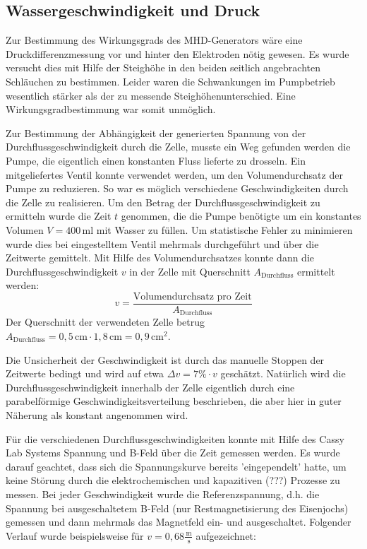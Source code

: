 \documentclass[11pt]{scrartcl}
\newcommand{\unit}[1]{\ensuremath{\,\mathrm{#1}}} %
\begin{document}
\subsection{Wassergeschwindigkeit und Druck}		%
Zur Bestimmung des Wirkungsgrads des MHD-Generators wäre eine Druckdifferenzmessung vor und hinter den Elektroden nötig gewesen.
Es wurde versucht dies mit Hilfe der Steighöhe in den beiden seitlich angebrachten Schläuchen zu bestimmen. Leider waren die Schwankungen im Pumpbetrieb wesentlich stärker als der zu messende Steighöhenunterschied.
Eine Wirkungsgradbestimmung war somit unmöglich.

Zur Bestimmung der Abhängigkeit der generierten Spannung von der Durchflussgeschwindigkeit durch die Zelle, musste ein Weg gefunden werden die Pumpe, die eigentlich einen konstanten Fluss lieferte zu drosseln.
Ein mitgeliefertes Ventil konnte verwendet werden, um den Volumendurchsatz der Pumpe zu reduzieren. So war es möglich verschiedene Geschwindigkeiten durch die Zelle zu realisieren.
Um den Betrag der Durchflussgeschwindigkeit zu ermitteln wurde die Zeit $t$ genommen, die die Pumpe benötigte um ein konstantes Volumen $V=400\unit{ml}$ mit Wasser zu füllen. Um statistische Fehler zu minimieren wurde dies bei eingestelltem Ventil mehrmals durchgeführt und über die Zeitwerte gemittelt.
Mit Hilfe des Volumendurchsatzes konnte dann die Durchflussgeschwindigkeit $v$ in der Zelle mit Querschnitt $A_{\text{Durchfluss}}$ ermittelt werden:
\[
v=\frac{\text{Volumendurchsatz pro Zeit}}{A_{\text{Durchfluss}}}
\]
Der Querschnitt der verwendeten Zelle betrug $A_{\text{Durchfluss}}=0,5\unit{cm} \cdot 1,8\unit{cm}=0,9\unit{cm^{2}}$.

Die Unsicherheit der Geschwindigkeit ist durch das manuelle Stoppen der Zeitwerte bedingt und wird auf etwa $\Delta v=7\% \cdot v$ geschätzt.
Natürlich wird die Durchflussgeschwindigkeit innerhalb der Zelle eigentlich durch eine parabelförmige Geschwindigkeitsverteilung beschrieben, die aber hier in guter Näherung als konstant angenommen wird. 

Für die verschiedenen Durchflussgeschwindigkeiten konnte mit Hilfe des Cassy Lab Systems Spannung und B-Feld über die Zeit gemessen werden. Es wurde darauf geachtet, dass sich die Spannungskurve bereits 'eingependelt' hatte, um keine Störung durch die elektrochemischen und kapazitiven (???) Prozesse zu messen.
Bei jeder Geschwindigkeit wurde die Referenzspannung, d.h. die Spannung bei ausgeschaltetem B-Feld (nur Restmagnetisierung des Eisenjochs) gemessen und dann mehrmals das Magnetfeld ein- und ausgeschaltet.
Folgender Verlauf wurde beispielsweise für $v=0,68\frac{\unit{m}}{\unit{s}}$ aufgezeichnet:
\end{document}
